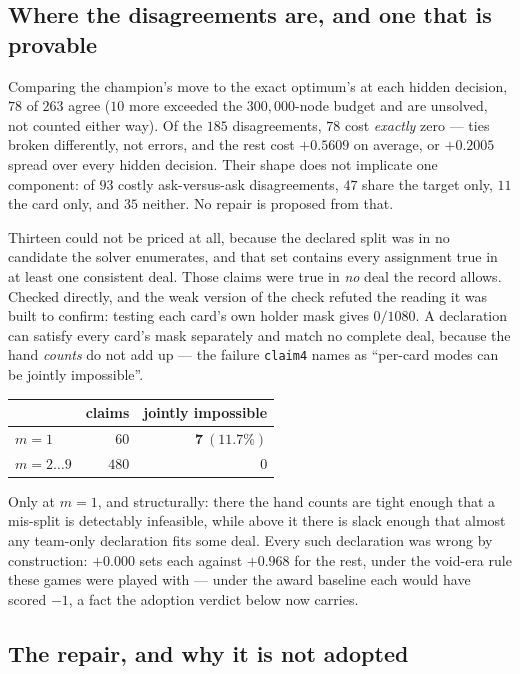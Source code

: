 \documentclass[11pt,letterpaper]{article}
\begin{document}
\subsection{Where the disagreements are, and one that is provable}
\label{sec:iidiff}

Comparing the champion's move to the exact optimum's at each hidden decision,
$78$ of $263$ agree ($10$ more exceeded the $300{,}000$-node budget and are
unsolved, not counted either way). Of the $185$ disagreements, $78$ cost
\emph{exactly} zero --- ties broken differently, not errors, and the rest cost
$+0.5609$ on average, or $+0.2005$ spread over every hidden decision. Their shape does not implicate one component: of $93$ costly
ask-versus-ask disagreements, $47$ share the target only, $11$ the card only,
and $35$ neither. No repair is proposed from that.

Thirteen could not be priced at all, because the declared split was in no
candidate the solver enumerates, and that set contains every assignment true
in at least one consistent deal. Those claims were true in \emph{no} deal the
record allows. Checked directly, and the weak version of the check refuted the
reading it was built to confirm: testing each card's own holder mask gives
$0/1080$. A declaration can satisfy every card's mask separately and match no
complete deal, because the hand \emph{counts} do not add up --- the failure
\texttt{claim4} names as ``per-card modes can be jointly impossible''.

\begin{center}
\begin{tabular}{lrr}
\toprule
& claims & jointly impossible \\
\midrule
$m = 1$ & $60$ & $\mathbf{7\ (11.7\%)}$ \\
$m = 2 \dots 9$ & $480$ & $0$ \\
\bottomrule
\end{tabular}
\end{center}

Only at $m = 1$, and structurally: there the hand counts are tight enough that
a mis-split is detectably infeasible, while above it there is slack enough that
almost any team-only declaration fits some deal. Every such declaration was
wrong by construction: $+0.000$ sets each against $+0.968$ for the rest,
under the void-era rule these games were played with --- under the award
baseline each would have scored $-1$, a fact the adoption verdict below now
carries.

\subsection{The repair, and why it is not adopted}
\end{document}
